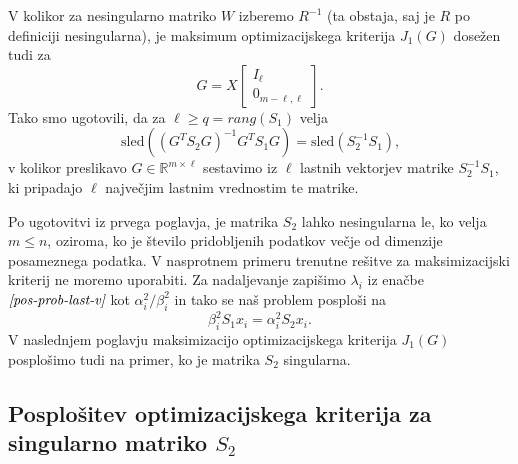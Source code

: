 \documentclass[mat1]{article}
\theoremstyle{definition}
\begin{document}
V kolikor za nesingularno matriko $W$ izberemo $R^{-1}$ (ta obstaja, saj je $R$ po definiciji nesingularna), je maksimum optimizacijskega kriterija $J_1(G)$ dosežen tudi za 
$$ G = X
\begin{bmatrix}
I_{\ell} \\
0_{m-\ell, \ell}
\end{bmatrix}
\text{.}
$$
Tako smo ugotovili, da za $\ell \geq q = rang(S_1)$ velja
$$
\text{sled} \left( (G^T S_2 G)^{-1} G^T S_1 G \right)
=
\text{sled} \left( S_2^{-1} S_1 \right)
\text{,}
$$
v kolikor preslikavo $G \in \mathbb{R}^{m \times \ell}$
sestavimo iz $\ell$ lastnih vektorjev matrike $S_2^{-1} S_1$, ki pripadajo $\ell$ največjim lastnim vrednostim te matrike.

Po ugotovitvi iz prvega poglavja, je matrika $S_2$ lahko nesingularna le, ko velja $m \leq n$, oziroma, ko je število pridobljenih podatkov večje od dimenzije posameznega podatka. V nasprotnem primeru trenutne rešitve za maksimizacijski kriterij ne moremo uporabiti. Za nadaljevanje zapišimo $\lambda_i$ iz enačbe $\textit{\eqref{pos-prob-last-v}}$ kot $\alpha_i^2/\beta_i^2$ in tako se naš problem posploši na
\begin{equation} \label{alpha-beta}
\beta_i^2 S_1 x_i = \alpha_i^2 S_2 x_i
\text{.}
\end{equation}
V naslednjem poglavju maksimizacijo optimizacijskega kriterija $J_1(G)$ posplošimo tudi na primer, ko je matrika $S_2$ singularna.

\subsection{Posplošitev optimizacijskega kriterija za singularno matriko $S_2$}
\end{document}
